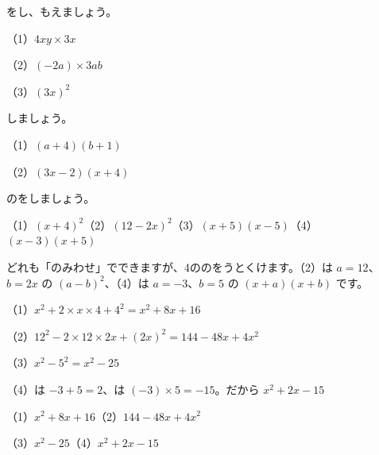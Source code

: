\begingroup{}%
\noindent\begin{minipage}[t]{0.49\linewidth}
\begin{jibun}
をし、もえましょう。\par
（1）$4xy\times3x$\par
（2）$(-2a)\times3ab$\par
（3）$(3x)^2$
\end{jibun}
\end{minipage}\hfill
\begin{minipage}[t]{0.49\linewidth}
\begin{jibun}
しましょう。\par
（1）$(a+4)(b+1)$\par
（2）$(3x-2)(x+4)$
\end{jibun}
\end{minipage}\par
\endgroup

\begin{reidai}[よく\R{使}{つか}う\R{展開}{てん|かい}の\R{形}{かたち}]
のをしましょう。\par
（1）$(x+4)^2$\qquad（2）$(12-2x)^2$\qquad（3）$(x+5)(x-5)$\qquad（4）$(x-3)(x+5)$\par
\kangaekata どれも「のみわせ」でできますが、4ののをうとくけます。（2）は $a=12$、$b=2x$ の $(a-b)^2$、（4）は $a=-3$、$b=5$ の $(x+a)(x+b)$ です。\par
\shiki（1）\nobreak $x^2+2\times x\times4+4^2=x^2+8x+16$\par
\hspace*{2.6\zw}（2）\nobreak $12^2-2\times12\times2x+(2x)^2=144-48x+4x^2$\par
\hspace*{2.6\zw}（3）\nobreak $x^2-5^2=x^2-25$\par
\hspace*{2.6\zw}（4）\nobreak {}は $-3+5=2$、は $(-3)\times5=-15$。だから $x^2+2x-15$\par
\kotae（1）\nobreak $x^2+8x+16$\qquad（2）\nobreak $144-48x+4x^2$\par
\hspace*{2.6\zw}（3）\nobreak $x^2-25$\qquad（4）\nobreak $x^2+2x-15$
\end{reidai}


